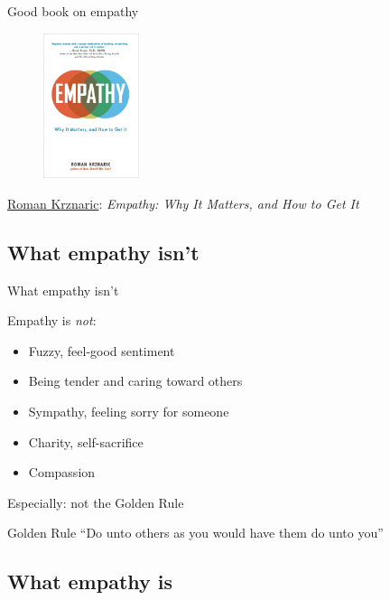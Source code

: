 \begin{frame}{Good book on empathy}
  \begin{figure}
    \includegraphics[width=0.25\textwidth]{Empathy-USA-cover-low-res-676x1024.jpg}
  \end{figure}

  \href{http://www.romankrznaric.com/}{Roman Krznaric}: {\emph{Empathy: Why It
        Matters, and How to Get It}}
\end{frame}

\subsection{What empathy isn't}

\begin{frame}{What empathy isn't}
  \begin{block}{Empathy is \emph{not}:}
    \begin{itemize}
    \item Fuzzy, feel-good sentiment
    \item Being tender and caring toward others
    \item Sympathy, feeling sorry for someone
    \item Charity, self-sacrifice
    \item Compassion
    \end{itemize}
  \end{block}
\end{frame}

\begin{frame}{Especially: not the Golden Rule}
  \begin{block}{Golden Rule}
    ``Do unto others as you would have them do unto you''
  \end{block}
\end{frame}


\subsection{What empathy is}

